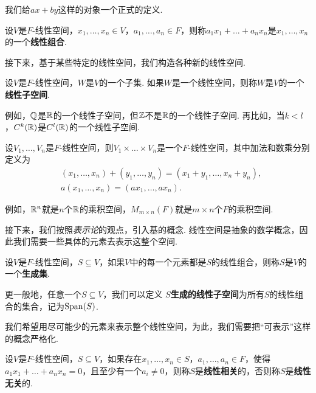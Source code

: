 我们给$ax+by$这样的对象一个正式的定义. 

\begin{definition}[线性组合]
设$V$是$F$-线性空间，$x_1,\dots,x_n\in V$，$a_1,\dots,a_n\in F$，则称$a_1x_1+\dots+a_nx_n$是$x_1,\dots,x_n$的一个\textbf{线性组合}. 
\end{definition}

接下来，基于某些特定的线性空间，我们构造各种新的线性空间. 

\begin{definition}[线性子空间]
设$V$是$F$-线性空间，$W$是$V$的一个子集. 如果$W$是一个线性空间，则称$W$是$V$的一个\textbf{线性子空间}. 
\end{definition}

例如，$\mathbb{Q}$是$\mathbb{R}$的一个线性子空间，但$\mathbb{Z}$不是$\mathbb{R}$的一个线性子空间. 再比如，当$k<l$，$C^k(\mathbb{R})$是$C^l(\mathbb{R})$的一个线性子空间. 

\begin{definition}[乘积空间]
设$V_1,\dots,V_n$是$F$-线性空间，则$V_1\times\dots\times V_n$是一个$F$-线性空间，其中加法和数乘分别定义为
\begin{align*}
    &(x_1,\dots,x_n)+(y_1,\dots,y_n)=(x_1+y_1,\dots,x_n+y_n),\\
    &a(x_1,\dots,x_n)=(ax_1,\dots,ax_n).
\end{align*}
\end{definition}

例如，$\mathbb{R}^n$就是$n$个$\mathbb{R}$的乘积空间，$M_{m\times n}(F)$就是$m\times n$个$F$的乘积空间. 

接下来，我们按照\textit{表示论}的观点，引入基的概念. 线性空间是抽象的数学概念，因此我们需要一些具体的元素去表示这整个空间. 

\begin{definition}[生成集]
设$V$是$F$-线性空间，$S\subseteq V$，如果$V$中的每一个元素都是$S$的线性组合，则称$S$是$V$的一个\textbf{生成集}. 

更一般地，任意一个$S\subseteq V$，我们可以定义 \textbf{$S$生成的线性子空间}为所有$S$的线性组合的集合，记为$\operatorname*{Span}(S)$. 
\end{definition}

我们希望用尽可能少的元素来表示整个线性空间，为此，我们需要把“可表示”这样的概念严格化. 

\begin{definition}[线性相关]
设$V$是$F$-线性空间，$S\subseteq V$，如果存在$x_1,\dots,x_n\in S$，$a_1,\dots,a_n\in F$，使得$a_1x_1+\dots+a_nx_n=0$，且至少有一个$a_i\neq 0$，则称$S$是\textbf{线性相关}的，否则称$S$是\textbf{线性无关}的. 
\end{definition}

